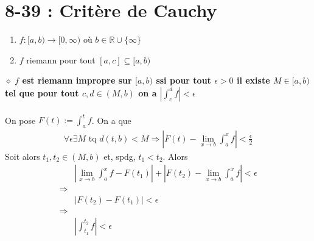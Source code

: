 \documentclass[a4paper,10pt]{article}
\begin{document}
\section*{8-39 : Critère de Cauchy}
\begin{enumerate}
 \item $f:[a,b) \rightarrow [0,\infty)$ où $b \in \mathbb{R} \cup \{\infty\}$
 \item $f$ riemann pour tout $[a,c] \subseteq [a,b)$
\end{enumerate}
$\diamond$ \textbf{$f$ est riemann impropre sur $[a,b)$ ssi pour tout $\epsilon >0$ il existe $M \in [a,b)$ tel que pour tout 
$c,d \in (M,b)$ on a $\left | \int_c^d f \right| < \epsilon$}
\\
\\
On pose $F(t) := \int_a^t f$. On a que 
\begin{align*}
 \forall \epsilon \exists M \text{ tq } d(t,b) < M \Rightarrow \left|F(t) - \lim_{x \to b} \int_a^x f \right| < \frac{\epsilon}{2}
\end{align*}
Soit alors $t_1,t_2 \in (M, b)$ et, spdg, $t_1 < t_2$. Alors 
\begin{align*}
 & \left|\lim_{x \to b} \int_a^x f - F(t_1) \right | + \left | F(t_2) - \lim_{x \to b} \int_a^x f \right | < \epsilon \\
 \Rightarrow \\
 & \left | F(t_2) - F(t_1) \right | < \epsilon \\
 \Rightarrow \\
 & \left | \int_{t_1}^{t_2} f \right | < \epsilon 
\end{align*}
\end{document}
